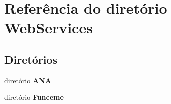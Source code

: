 \section{Referência do diretório Web\+Services}
\label{dir_1132f9000ead323f2124301348c56fef}
\subsection*{Diretórios}
\begin{DoxyCompactItemize}
\item 
diretório {\bf A\+NA}
\item 
diretório {\bf Funceme}
\end{DoxyCompactItemize}
